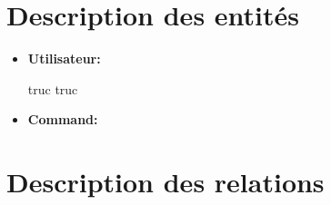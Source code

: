 \documentclass[a4paper,10pt]{article}
\begin{document}

\section{Description des entités}

\begin{itemize}
    \item \textbf{Utilisateur:}
    
    truc truc
    
    \item \textbf{Command:}
\end{itemize}

\section{Description des relations}
\end{document}
